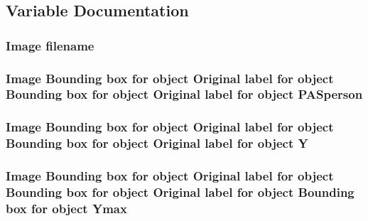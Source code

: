 \subsection{Variable Documentation}
\subsubsection[{\texorpdfstring{filename}{filename}}]{\setlength{\rightskip}{0pt plus 5cm}Image filename}\hypertarget{person__331_8txt_a8fb7cd54abaa35f0affcd036288e33b1}{}\label{person__331_8txt_a8fb7cd54abaa35f0affcd036288e33b1}
\subsubsection[{\texorpdfstring{P\+A\+Sperson}{PASperson}}]{\setlength{\rightskip}{0pt plus 5cm}Image Bounding box for object Original label for object Bounding box for object Original label for object P\+A\+Sperson}\hypertarget{person__331_8txt_a5e39cc2f8901d4958113d54075314fae}{}\label{person__331_8txt_a5e39cc2f8901d4958113d54075314fae}
\subsubsection[{\texorpdfstring{Y}{Y}}]{\setlength{\rightskip}{0pt plus 5cm}Image Bounding box for object Original label for object Bounding box for object Original label for object Y}\hypertarget{person__331_8txt_af3b1f3841810e39f13473ad32744a6c5}{}\label{person__331_8txt_af3b1f3841810e39f13473ad32744a6c5}
\subsubsection[{\texorpdfstring{Ymax}{Ymax}}]{\setlength{\rightskip}{0pt plus 5cm}Image Bounding box for object Original label for object Bounding box for object Original label for object Bounding box for object Ymax}\hypertarget{person__331_8txt_a5e09200f24fba566f16b31d5e57d6834}{}\label{person__331_8txt_a5e09200f24fba566f16b31d5e57d6834}
